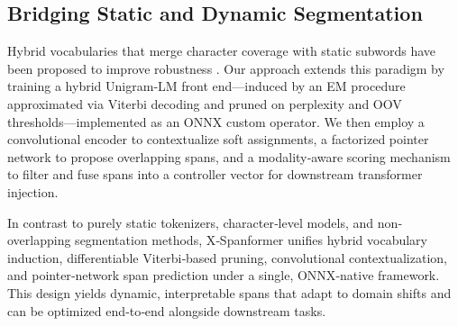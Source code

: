 \subsection{Bridging Static and Dynamic Segmentation}
Hybrid vocabularies that merge character coverage with static subwords have been proposed to improve robustness \cite{tay2021charformer,clark2021canine}. Our approach extends this paradigm by training a hybrid Unigram‐LM front end—induced by an EM procedure approximated via Viterbi decoding and pruned on perplexity and OOV thresholds—implemented as an ONNX custom operator. We then employ a convolutional encoder to contextualize soft assignments, a factorized pointer network to propose overlapping spans, and a modality‐aware scoring mechanism to filter and fuse spans into a controller vector for downstream transformer injection.

\medskip
In contrast to purely static tokenizers, character‐level models, and non‐overlapping segmentation methods, X‐Spanformer unifies hybrid vocabulary induction, differentiable Viterbi‐based pruning, convolutional contextualization, and pointer‐network span prediction under a single, ONNX‐native framework. This design yields dynamic, interpretable spans that adapt to domain shifts and can be optimized end‐to‐end alongside downstream tasks.  